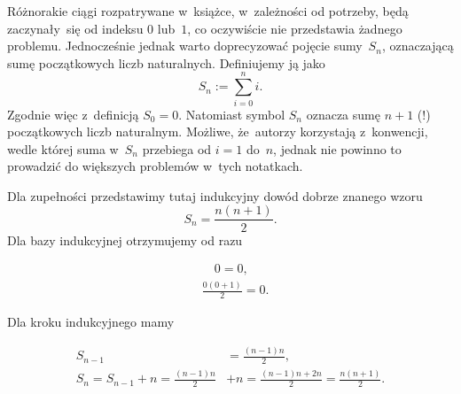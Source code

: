\documentclass[a4paper,11pt]{article}
\numberwithin{equation}{section}
\begin{document}
Różnorakie ciągi rozpatrywane w~książce, w~zależności od potrzeby, będą
zaczynały~się od indeksu $0$ lub~$1$, co oczywiście nie przedstawia żadnego
problemu. Jednocześnie jednak warto doprecyzować pojęcie sumy~$S_{ n }$,
oznaczającą sumę początkowych liczb naturalnych. Definiujemy ją jako
\begin{equation}
  \label{eq:1112}
  S_{ n } := \sum_{ i = 0 }^{ n } i.
\end{equation}
Zgodnie więc z~definicją $S_{ 0 } = 0$. Natomiast symbol $S_{ n }$ oznacza
sumę $n + 1$ (!) początkowych liczb naturalnym. Możliwe, że~autorzy
korzystają z~konwencji, wedle której suma w~$S_{ n }$ przebiega od $i = 1$
do~$n$, jednak nie powinno to prowadzić do większych problemów w~tych
notatkach.

\VerSpaceFour





\noindent
Dla zupełności przedstawimy tutaj indukcyjny dowód dobrze znanego wzoru
\begin{equation}
  \label{eq:1113}
  S_{ n } = \frac{ n ( n + 1 ) }{ 2 }.
\end{equation}
Dla bazy indukcyjnej otrzymujemy od razu

\negVerSpaceFour


\begin{subequations}

  \begin{align}
    \label{eq:aa}
    &\hspace{1em} 0 = 0, \\
    &\frac{ 0 ( 0 + 1 ) }{ 2 } = 0.
  \end{align}

\end{subequations}


\noindent
Dla kroku indukcyjnego mamy

\begin{subequations}

  \begin{align}
    \label{eq:aa}
    S_{ n - 1 } &= \frac{ ( n - 1 ) n }{ 2 }, \\[0.2em]
    S_{ n } = S_{ n - 1 } + n = \frac{ ( n - 1 ) n }{ 2 }
                &+ n =
                  \frac{ ( n - 1 ) n  + 2n }{ 2 } =
                  \frac{ n ( n + 1 ) }{ 2 }.
  \end{align}

\end{subequations}
\end{document}
